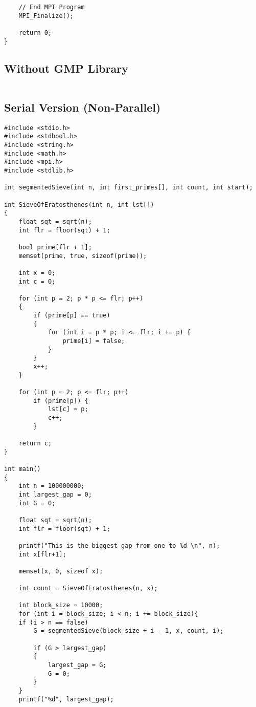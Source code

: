 \documentclass[12pt]{article}
\begin{document}
{\begin{lstlisting}
	// End MPI Program
	MPI_Finalize();

	return 0;
}
    \end{lstlisting}
    \subsection{Without GMP Library}
    \begin{lstlisting}
    \end{lstlisting}

    \subsection{Serial Version (Non-Parallel)}
    \begin{lstlisting}
#include <stdio.h>
#include <stdbool.h>
#include <string.h>
#include <math.h>
#include <mpi.h>
#include <stdlib.h>

int segmentedSieve(int n, int first_primes[], int count, int start);

int SieveOfEratosthenes(int n, int lst[])
{
    float sqt = sqrt(n);
    int flr = floor(sqt) + 1;

    bool prime[flr + 1];
    memset(prime, true, sizeof(prime));

    int x = 0;
    int c = 0;

    for (int p = 2; p * p <= flr; p++)
    {
        if (prime[p] == true)
        {
            for (int i = p * p; i <= flr; i += p) {
                prime[i] = false;
            }
        }
        x++;
    }

    for (int p = 2; p <= flr; p++)
        if (prime[p]) {
            lst[c] = p;
            c++;
        }

    return c;
}

int main()
{
    int n = 100000000;
    int largest_gap = 0;
    int G = 0;

    float sqt = sqrt(n);
    int flr = floor(sqt) + 1;
    
    printf("This is the biggest gap from one to %d \n", n);
    int x[flr+1];

    memset(x, 0, sizeof x);

    int count = SieveOfEratosthenes(n, x);

    int block_size = 10000;
    for (int i = block_size; i < n; i += block_size){
    if (i > n == false)
        G = segmentedSieve(block_size + i - 1, x, count, i);

        if (G > largest_gap)
        {
            largest_gap = G;
            G = 0;
        }
    }
    printf("%d", largest_gap);


\end{lstlisting}}
\end{document}
